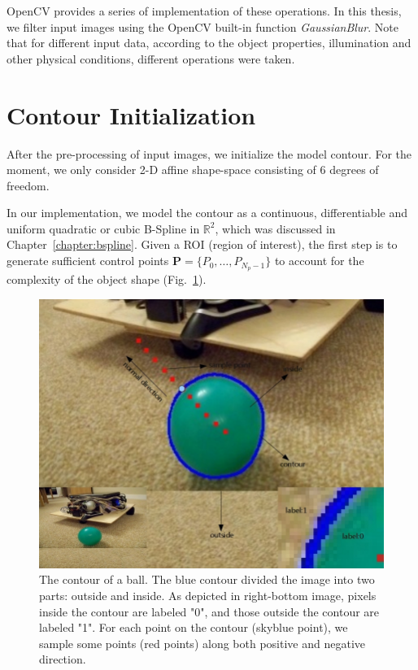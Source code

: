 OpenCV provides a series of implementation of these operations. In
this thesis, we filter input images using the OpenCV built-in function
\textit{GaussianBlur}. Note
that for different input data, according to the object properties,
illumination and other physical conditions, different operations
were taken. 

\section{Contour Initialization}
\label{sec:mp}

After the pre-processing of input images,  we initialize the model contour. For the moment, we only consider 2-D
affine shape-space consisting of 6 degrees of freedom. %

In our implementation, we model the
contour as a continuous, differentiable and uniform quadratic or cubic
B-Spline in $\mathbb{R}^2$, which was discussed in Chapter~\ref{chapter:bspline}. 
Given a ROI (region of interest), the first step is to generate
sufficient control points $\mathbf{P} = \{P_0, \ldots, P_{N_p-1}\}$ to
account for the complexity of the object shape (Fig.~\ref{fig:prior}).

\begin{figure}[htb]
  \centering
  \includegraphics[width=\linewidth]{images/cont.jpg}
\caption[The contour of a ball ]{The contour of a ball. The blue contour
  divided the image into two parts: outside and inside. As depicted in
  right-bottom image, pixels inside the contour are labeled "0",
  and those outside the contour are labeled "1". For each point on the
  contour (skyblue point), we sample some points (red points) along both positive
  and negative direction.}
\label{fig:prior}
\end{figure}

